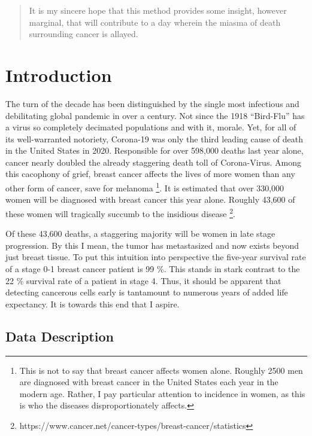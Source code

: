 \documentclass[11pt]{article}
\begin{document}
\begin{abstract}
	It is my sincere hope that this method provides some insight, however marginal, that will contribute to a day wherein the miasma of death surrounding cancer is allayed.  
	
\end{abstract}

\section{Introduction}

The turn of the decade has been distinguished by the single most infectious and debilitating global pandemic in over a century.  Not since the 1918 “Bird-Flu” has a virus so completely decimated populations and with it, morale.  Yet, for all of its well-warranted notoriety, Corona-19 was only the third leading cause of death in the United States in 2020.  Responsible for over 598,000 deaths last year alone, cancer nearly doubled the already staggering death toll of Corona-Virus.  Among this cacophony of grief, breast cancer affects the lives of more women than any other form of cancer, save for melanoma \footnote{This is not to say that breast cancer affects women alone.  Roughly 2500 men are diagnosed with breast cancer in the United States each year in the modern age.  Rather, I pay particular attention to incidence in women, as this is who the diseases disproportionately affects.}.  It is estimated that over 330,000 women will be diagnosed with breast cancer this year alone.  Roughly 43,600 of these women will tragically succumb to the insidious disease \footnote{https://www.cancer.net/cancer-types/breast-cancer/statistics}.  

	Of these 43,600 deaths, a staggering majority will be women in late stage progression.  By this I mean, the tumor has metastasized and now exists beyond just breast tissue.  To put this intuition into perspective the five-year survival rate of a stage 0-1 breast cancer patient is 99 \%.  This stands in stark contrast to the 22 \% survival rate of a patient in stage 4.  Thus, it should be apparent that detecting cancerous cells early is tantamount to numerous years of added life expectancy.  It is towards this end that I aspire.  
	
\subsection{Data Description}
\end{document}
